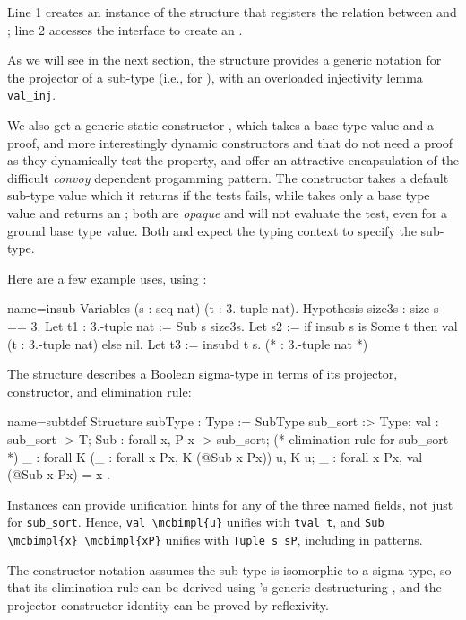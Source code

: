 Line 1 creates an instance of the  structure that registers the
relation between  and ; line 2 accesses the 
interface to create an .

As we will see in the next section, the  structure provides
a generic notation  for the projector of a sub-type (i.e.,
 for ),
with an overloaded injectivity lemma \lstinline/val_inj/.

We also get a generic static constructor , which takes a base
type value and a proof, and more interestingly dynamic constructors
 and  that do not need a proof as they dynamically
test the property, and offer an attractive encapsulation of the
difficult \emph{convoy} dependent progamming pattern. The 
constructor takes a default sub-type value which it returns if the
tests fails, while  takes only a base type value and returns
an ; both are \emph{opaque} and will not evaluate the test,
even for a ground base type value.  Both  and  expect
the typing context to specify the sub-type.

Here are a few example uses, using :

\begin{coq}{name=insub}{}
Variables (s : seq nat) (t : 3.-tuple nat).
Hypothesis size3s : size s == 3.
Let t1 : 3.-tuple nat := Sub s size3s.
Let s2 := if insub s is Some t then val (t : 3.-tuple nat) else nil.
Let t3 := insubd t s. (* : 3.-tuple nat *)
\end{coq}

The  structure describes a Boolean sigma-type in terms of
its projector, constructor, and elimination rule:

\begin{coq}{name=subtdef}{}
Structure subType : Type := SubType {
  sub_sort :> Type;
  val : sub_sort -> T;
  Sub : forall x, P x -> sub_sort;
  (* elimination rule for sub_sort *)
  _ : forall K (_ : forall x Px, K (@Sub x Px)) u, K u;
  _ : forall x Px, val (@Sub x Px) = x
}.
\end{coq}

Instances can provide unification hints for any of the three named fields,
not just for \lstinline/sub_sort/. Hence, \lstinline/val \mcbimpl{u}/
unifies with \lstinline/tval t/, and \lstinline/Sub \mcbimpl{x} \mcbimpl{xP}/ 
unifies with \lstinline/Tuple s sP/, including in  patterns.

The  constructor notation assumes the sub-type is isomorphic
to a sigma-type, so that its elimination rule can be derived using \Coq{}'s
generic destructuring , and the projector-constructor
identity can be proved by reflexivity.

